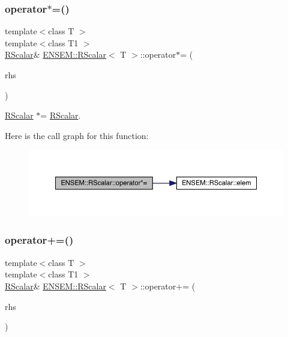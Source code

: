 \subsubsection{\texorpdfstring{operator$\ast$=()}{operator*=()}\hspace{0.1cm}{\footnotesize\ttfamily [2/2]}}
{\footnotesize\ttfamily template$<$class T $>$ \\
template$<$class T1 $>$ \\
\mbox{\hyperlink{classENSEM_1_1RScalar}{R\+Scalar}}\& \mbox{\hyperlink{classENSEM_1_1RScalar}{E\+N\+S\+E\+M\+::\+R\+Scalar}}$<$ T $>$\+::operator$\ast$= (\begin{DoxyParamCaption}\item[{const \mbox{\hyperlink{classENSEM_1_1RScalar}{R\+Scalar}}$<$ T1 $>$ \&}]{rhs }\end{DoxyParamCaption})\hspace{0.3cm}{\ttfamily [inline]}}



\mbox{\hyperlink{classENSEM_1_1RScalar}{R\+Scalar}} $\ast$= \mbox{\hyperlink{classENSEM_1_1RScalar}{R\+Scalar}}. 

Here is the call graph for this function\+:
\nopagebreak
\begin{figure}[H]
\begin{center}
\leavevmode
\includegraphics[width=350pt]{d0/d8c/classENSEM_1_1RScalar_a4e8f4b8988a47a5e5eef56424d0e23d9_cgraph}
\end{center}
\end{figure}
\mbox{\label{classENSEM_1_1RScalar_adc6bf2610b8af0ab175ef00d9194aa1d}} 
\subsubsection{\texorpdfstring{operator+=()}{operator+=()}\hspace{0.1cm}{\footnotesize\ttfamily [1/2]}}
{\footnotesize\ttfamily template$<$class T $>$ \\
template$<$class T1 $>$ \\
\mbox{\hyperlink{classENSEM_1_1RScalar}{R\+Scalar}}\& \mbox{\hyperlink{classENSEM_1_1RScalar}{E\+N\+S\+E\+M\+::\+R\+Scalar}}$<$ T $>$\+::operator+= (\begin{DoxyParamCaption}\item[{const \mbox{\hyperlink{classENSEM_1_1RScalar}{R\+Scalar}}$<$ T1 $>$ \&}]{rhs }\end{DoxyParamCaption})\hspace{0.3cm}{\ttfamily [inline]}}



